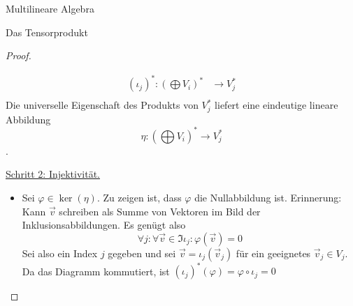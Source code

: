 \documentclass{report}
\newcommand{\ul}[1]{\underline{#1}}
\newcommand{\vv}{\vec{v}}
\begin{document}
\begin{chapter}{Multilineare Algebra}
\begin{section}{Das Tensorprodukt}
\begin{proof}
\begin{itemize}
			\begin{align*}
				(\iota_j)^* : \left(\bigoplus V_i\right)^* &\to V_j^*\\
			\end{align*}
			Die universelle Eigenschaft des Produkts von $V_j^*$ liefert eine eindeutige lineare Abbildung \[\eta : \left(\bigoplus V_i\right)^* \to V_j^*\].		
		\end{itemize}
		\ul{Schritt 2: Injektivität.}
		\begin{itemize}
			\item[] Sei $\varphi \in \ker(\eta)$. Zu zeigen ist, dass $\varphi$ die Nullabbildung ist. Erinnerung: Kann $\vv$ schreiben als Summe von Vektoren im Bild der Inklusionsabbildungen. Es genügt also 
			\[\forall j : \forall \vv \in \Im{\iota_j} : \varphi(\vv) = 0\]
			Sei also ein Index $j$ gegeben und sei $\vv = \iota_j (\vv_j)$ für ein geeignetes $\vv_j \in V_j$. Da das Diagramm kommutiert, ist $(\iota_j)^*(\varphi) = \varphi \circ \iota_j = 0$
		\end{itemize}
	\end{proof}
\end{section}

\end{chapter}

%
%
%
%
%
%
%
%
%
%
%
%
%
%
%
%
%
%
%
%
%
%
%
%
%
%
%
%
%
%
%
%
%
%
%
\appendix
\end{document}
